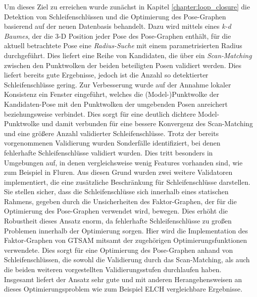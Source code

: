 Um dieses Ziel zu erreichen wurde zunächst in Kapitel \ref{chapter:loop_closure} die Detektion von Schleifenschlüssen und die Optimierung des Pose-Graphen basierend auf der neuen Datenbasis behandelt. Dazu wird mittels eines \emph{k-d Baumes}, der die 3-D Position jeder Pose des Pose-Graphen enthält, für die aktuell betrachtete Pose eine \emph{Radius-Suche} mit einem parametrisierten Radius durchgeführt. Dies liefert eine Reihe von Kandidaten, die über ein \emph{Scan-Matching} zwischen den Punktwolken der beiden beteiligten Posen validiert werden. Dies liefert bereits gute Ergebnisse, jedoch ist die Anzahl so detektierter Schleifenschlüsse gering. Zur Verbesserung wurde auf der Annahme lokaler Konsistenz ein Fenster eingeführt, welches die (Model-)Punktwolke der Kandidaten-Pose mit den Punktwolken der umgebenden Posen anreichert beziehungsweise verbindet. Dies sorgt für eine deutlich dichtere Model-Punktwolke und damit verbunden für eine bessere Konvergenz des Scan-Matching und eine größere Anzahl validierter Schleifenschlüsse. Trotz der bereits vorgenommenen Validierung wurden Sonderfälle identifiziert, bei denen fehlerhafte Schleifenschlüsse validiert wurden. Dies tritt besonders in Umgebungen auf, in denen vergleichsweise wenig Features vorhanden sind, wie zum Beispiel in Fluren. Aus diesen Grund wurden zwei weitere Validatoren implementiert, die eine zusätzliche Beschränkung für Schleifenschlüsse darstellen. Sie stellen sicher, dass die Schleifenschlüsse sich innerhalb eines statischen Rahmens, gegeben durch die Unsicherheiten des Faktor-Graphen, der für die Optimierung des Pose-Graphen verwendet wird, bewegen. Dies erhöht die Robustheit dieses Ansatz enorm, da fehlerhafte Schleifenschlüsse zu großen Problemen innerhalb der Optimierung sorgen. Hier wird die Implementation des Faktor-Graphen von GTSAM \cite{dellaert2012factor} mitsamt der zugehörigen Optimierungsfunktionen verwendete. Dies sorgt für eine Optimierung des Pose-Graphen anhand von Schleifenschlüssen, die sowohl die Validierung durch das Scan-Matching, als auch die beiden weiteren vorgestellten Validierungsstufen durchlaufen haben. Insgesamt liefert der Ansatz sehr gute und mit anderen Herangehensweisen an dieses Optimierungsproblem wie zum Beispiel ELCH \cite{sprickerhof2011heuristic} vergleichbare Ergebnisse. 

